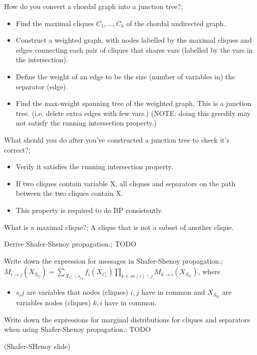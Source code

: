 \documentclass{article}
\begin{document}
How do you convert a chordal graph into a junction tree?; \begin{itemize}
    \item Find the maximal cliques $C_1,...,C_k$ of the chordal undirected graph.
    \item Construct a weighted graph, with nodes labelled by the maximal cliques and edges connecting each pair of cliques that shares vars (labelled by the vars in the intersection).
    \item Define the weight of an edge to be the size (number of variables in) the separator (edge).
    \item Find the max-weight spanning tree of the weighted graph. This is a junction tree. (i.e. delete extra edges with few vars.) (NOTE: doing this greedily may not satisfy the running intersection property.)
\end{itemize}

What should you do after you've constructed a junction tree to check it's correct?; \begin{itemize}
    \item Verify it satisfies the running intersection property.
    \item If two cliques contain variable X, all cliques and separators on the path between the two cliques contain X.
    \item This property is required to do BP consistently.
\end{itemize}

What is a maximal clique?; A clique that is not a subset of another clique.

Derive Shafer-Shenoy propagation.; TODO

Write down the expression for messages in Shafer-Shenoy propagation.; $M_{i\rightarrow j}(X_{S_{ij}})=\sum_{X_{C_i}\backslash s_{ij}}f_i(X_{C_i})\prod_{k\in ne(i)\backslash j}M_{k\rightarrow i}(X_{S_{ki}})$, where \begin{itemize}
    \item $s_ij$ are variables that nodes (cliques) $i, j$ have in common and
    $X_{S_{ki}}$ are variables nodes (cliques) $k, i$ have in common.
\end{itemize}

Write down the expressions for marginal distributions for cliques and separators when using Shafer-Shenoy propagation.; TODO

(Shafer-SHenoy slide)
\end{document}
